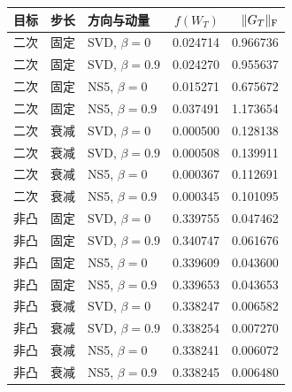 \begin{tabular}{lllrr}
\toprule
目标 & 步长 & 方向与动量 & $f(W_T)$ & $\|G_T\|_{\mathrm{F}}$\\
\midrule
二次 & 固定 & SVD, $\beta=0$ & 0.024714 & 0.966736\\
二次 & 固定 & SVD, $\beta=0.9$ & 0.024270 & 0.955637\\
二次 & 固定 & NS5, $\beta=0$ & 0.015271 & 0.675672\\
二次 & 固定 & NS5, $\beta=0.9$ & 0.037491 & 1.173654\\
二次 & 衰减 & SVD, $\beta=0$ & 0.000500 & 0.128138\\
二次 & 衰减 & SVD, $\beta=0.9$ & 0.000508 & 0.139911\\
二次 & 衰减 & NS5, $\beta=0$ & 0.000367 & 0.112691\\
二次 & 衰减 & NS5, $\beta=0.9$ & 0.000345 & 0.101095\\
非凸 & 固定 & SVD, $\beta=0$ & 0.339755 & 0.047462\\
非凸 & 固定 & SVD, $\beta=0.9$ & 0.340747 & 0.061676\\
非凸 & 固定 & NS5, $\beta=0$ & 0.339609 & 0.043600\\
非凸 & 固定 & NS5, $\beta=0.9$ & 0.339653 & 0.043653\\
非凸 & 衰减 & SVD, $\beta=0$ & 0.338247 & 0.006582\\
非凸 & 衰减 & SVD, $\beta=0.9$ & 0.338254 & 0.007270\\
非凸 & 衰减 & NS5, $\beta=0$ & 0.338241 & 0.006072\\
非凸 & 衰减 & NS5, $\beta=0.9$ & 0.338245 & 0.006480\\
\bottomrule
\end{tabular}
